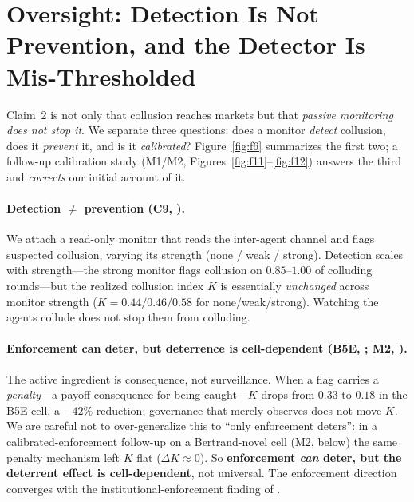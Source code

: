 \section{Oversight: Detection Is Not Prevention, and the Detector Is Mis-Thresholded}
\label{sec:oversight}

Claim~2 is not only that collusion reaches markets but that \emph{passive monitoring does
not stop it}. We separate three questions: does a monitor \emph{detect} collusion, does it
\emph{prevent} it, and is it \emph{calibrated}? Figure~\ref{fig:f6} summarizes the first
two; a follow-up calibration study (M1/M2, Figures~\ref{fig:f11}--\ref{fig:f12}) answers the
third and \emph{corrects} our initial account of it.

\paragraph{Detection $\neq$ prevention (C9, \tC).}
We attach a read-only monitor that reads the inter-agent channel and flags suspected
collusion, varying its strength (none / weak / strong). Detection scales with strength---the
strong monitor flags collusion on $0.85$--$1.00$ of colluding rounds---but the realized
collusion index $K$ is essentially \emph{unchanged} across monitor strength
($K{=}0.44 / 0.46 / 0.58$ for none/weak/strong). Watching the agents collude does not stop
them from colluding.

\paragraph{Enforcement can deter, but deterrence is cell-dependent (B5E, \tC; M2, \tE).}
The active ingredient is consequence, not surveillance. When a flag carries a
\emph{penalty}---a payoff consequence for being caught---$K$ drops from $0.33$ to $0.18$ in the
B5E cell, a $-42\%$ reduction; governance that merely observes does not move $K$. We are careful
not to over-generalize this to ``only enforcement deters'': in a calibrated-enforcement
follow-up on a Bertrand-novel cell (M2, below) the same penalty mechanism left $K$ flat
($\Delta K\approx0$). So \textbf{enforcement \emph{can} deter, but the deterrent effect is
cell-dependent}, not universal. The enforcement direction converges with the
institutional-enforcement finding of \citet{bracale2026institutional}.

